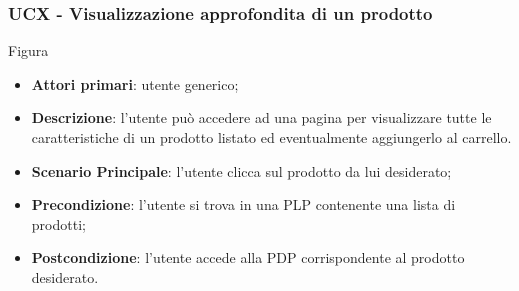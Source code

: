 \subsubsection{UCX - Visualizzazione approfondita di un prodotto}
Figura \\
\begin{itemize}
\item \textbf{Attori primari}: utente generico;
\item \textbf{Descrizione}: l'utente può accedere ad una pagina per visualizzare tutte le caratteristiche di un prodotto listato ed eventualmente aggiungerlo al carrello.
\item \textbf{Scenario Principale}: l'utente clicca sul prodotto da lui desiderato;
\item \textbf{Precondizione}: l'utente si trova in una PLP contenente una lista di prodotti;
\item \textbf{Postcondizione}: l'utente accede alla PDP corrispondente al prodotto desiderato.
\end{itemize}